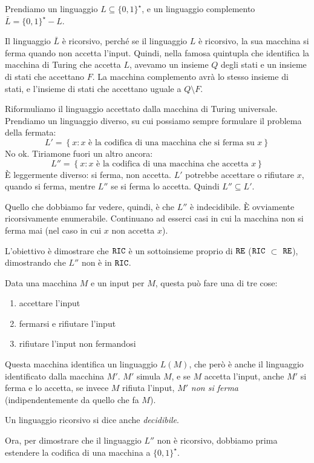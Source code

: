 Prendiamo un linguaggio $L \subseteq \{0,1\}^{\star}$, e un linguaggio complemento $\bar{L} = \{0,1\}^{\star} - L$.

Il linguaggio $\bar{L}$ \`e ricorsivo, perch\'e se il linguaggio $L$ \`e ricorsivo, la sua macchina si ferma quando non accetta l'input. Quindi, nella famosa quintupla che identifica la macchina di Turing che accetta $L$, avevamo un insieme $Q$ degli stati e un insieme di stati che accettano $F$. La macchina complemento avr\`a lo stesso insieme di stati, e l'insieme di stati che accettano uguale a $Q \setminus F$.

Riformuliamo il linguaggio accettato dalla macchina di Turing universale. Prendiamo un linguaggio diverso, su cui possiamo sempre formulare il problema della fermata:
\[
L' = \left\{ x : x \text{ \`e la codifica di una macchina che si ferma su } x \right\}
\]
No ok. Tiriamone fuori un altro ancora:
\[
L'' = \left\{ x : x \text{ \`e la codifica di una macchina che accetta } x \right\}
\]
\`E leggermente diverso: si ferma, non accetta. $L'$ potrebbe accettare o rifiutare $x$, quando si ferma, mentre $L''$ se si ferma lo accetta. Quindi $L'' \subseteq L'$.

Quello che dobbiamo far vedere, quindi, \`e che $L''$ \`e indecidibile. \`E ovviamente ricorsivamente enumerabile. Continuano ad esserci casi in cui la macchina non si ferma mai (nel caso in cui $x$ non accetta $x$).

L'obiettivo \`e dimostrare che $\texttt{RIC}$ \`e un sottoinsieme proprio di $\texttt{RE}$ ($\texttt{RIC}$ $\subset$ $\texttt{RE}$), dimostrando che $L''$ non \`e in $\texttt{RIC}$.

Data una macchina $M$ e un input per $M$, questa pu\`o fare una di tre cose:
\begin{enumerate}
    \item accettare l'input
    \item fermarsi e rifiutare l'input
    \item rifiutare l'input non fermandosi
\end{enumerate}
Questa macchina identifica un linguaggio $L(M)$, che per\`o \`e anche il linguaggio identificato dalla macchina $M'$. $M'$ simula $M$, e se $M$ accetta l'input, anche $M'$ si ferma e lo accetta, se invece $M$ rifiuta l'input, $M'$ \emph{non si ferma} (indipendentemente da quello che fa $M$).

Un linguaggio ricorsivo si dice anche \emph{decidibile}.

Ora, per dimostrare che il linguaggio $L''$ non \`e ricorsivo, dobbiamo prima estendere la codifica di una macchina a $\{0,1\}^{\star}$.

